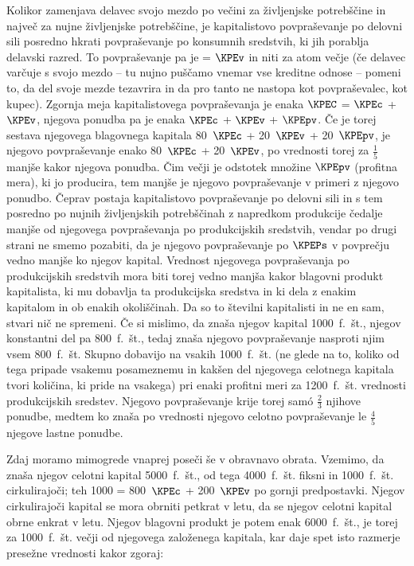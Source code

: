 \documentclass[kapital_02.tex]{subfiles}
\begin{document}
Kolikor zamenjava delavec svojo mezdo po večini za življenjske potrebščine in največ za nujne življenjske potrebščine, je kapitalistovo povpraševanje po delovni sili posredno hkrati povpraševanje po konsumnih sredstvih, ki jih porablja delavski razred. To povpraševanje pa je = \( \KPEv \) in niti za atom večje (če delavec varčuje s svojo mezdo -- tu nujno puščamo vnemar vse kreditne odnose -- pomeni to, da del svoje mezde tezavrira in da pro tanto ne nastopa kot povpraševalec, kot kupec). Zgornja meja kapitalistovega povpraševanja je enaka \( \KPEC \) = \( \KPEc \) + \( \KPEv \), njegova ponudba pa je enaka \( \KPEc \) + \( \KPEv \) + \( \KPEpv \). Če je torej sestava njegovega blagovnega kapitala 80~\( \KPEc \) + 20~\( \KPEv \) + 20~\( \KPEpv \), je njegovo povpraševanje enako 80~\( \KPEc \) + 20~\( \KPEv \), po vrednosti torej za $\frac{1}{5}$ manjše kakor njegova ponudba. Čim večji je odstotek množine \( \KPEpv \) (profitna mera), ki jo producira, tem manjše je njegovo povpraševanje v primeri z njegovo ponudbo. Čeprav postaja kapitalistovo povpraševanje po delovni sili in s tem posredno \KPEstran po nujnih življenjskih potrebščinah z napredkom produkcije čedalje manjše od njegovega povpraševanja po produkcijskih sredstvih, vendar po drugi strani ne smemo pozabiti, da je njegovo povpraševanje po \( \KPEPs \) v povprečju vedno manjše ko njegov kapital. Vrednost njegovega povpraševanja po produkcijskih sredstvih mora biti torej vedno manjša kakor blagovni produkt kapitalista, ki mu dobavlja ta produkcijska sredstva in ki dela z enakim kapitalom in ob enakih okoliščinah. Da so to številni kapitalisti in ne en sam, stvari nič ne spremeni. Če si mislimo, da znaša njegov kapital 1000\ f.\ št., njegov konstantni del pa 800\ f.\ št., tedaj znaša njegovo povpraševanje nasproti njim vsem 800\ f.\ št. Skupno dobavijo na vsakih 1000\ f.\ št. (ne glede na to, koliko od tega pripade vsakemu posameznemu in kakšen del njegovega celotnega kapitala tvori količina, ki pride na vsakega) pri enaki profitni meri za 1200\ f.\ št. vrednosti produkcijskih sredstev. Njegovo povpraševanje krije torej sam\'o $\frac{2}{3}$ njihove ponudbe, medtem ko znaša po vrednosti njegovo celotno povpraševanje le $\frac{4}{5}$ njegove lastne ponudbe.

Zdaj moramo mimogrede vnaprej poseči še v obravnavo obrata. Vzemimo, da znaša njegov celotni kapital 5000\ f.\ št., od tega 4000\ f.\ št. fiksni in 1000\ f.\ št. cirkulirajoči; teh 1000 = 800~\( \KPEc \) + 200~\( \KPEv \) po gornji predpostavki. Njegov cirkulirajoči kapital se mora obrniti petkrat v letu, da se njegov celotni kapital obrne enkrat v letu. Njegov blagovni produkt je potem enak 6000\ f.\ št., je torej za 1000\ f.\ št. večji od njegovega založenega kapitala, kar daje spet isto razmerje presežne vrednosti kakor zgoraj:
\end{document}
